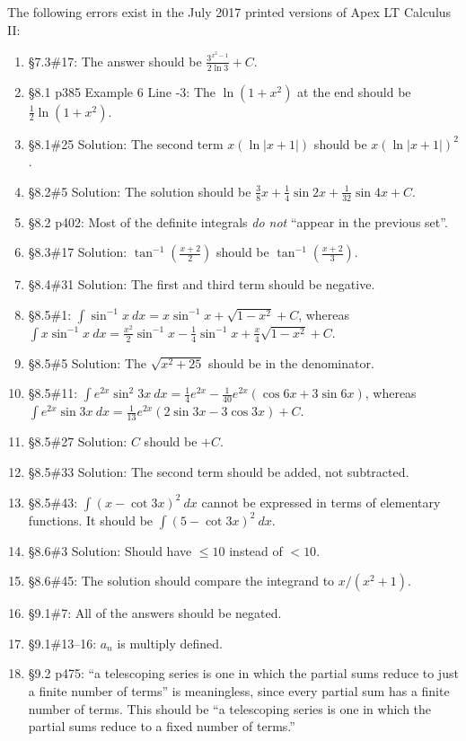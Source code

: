 \documentclass{amsart}
\newcommand{\ds}{\displaystyle}
\newcommand{\abs}[1]{\left\lvert#1\right\rvert}
\begin{document}
The following errors exist in the July 2017 printed versions of Apex LT Calculus II:
\begin{enumerate}
\item \S7.3\#17: The answer should be $\frac{3^{x^2-1}}{2\ln3}+C$.
\item \S8.1 p385 Example 6 Line -3: The $\ln(1+x^2)$ at the end should be $\frac12\ln(1+x^2)$.
\item \S8.1\#25 Solution: The second term $x\left(\ln\abs{x+1}\right)$ should be $x\left(\ln\abs{x+1}\right)^2$.
\item \S8.2\#5 Solution: The solution should be $\frac38 x+\frac14\sin2x+\frac1{32}\sin4x+C$.
\item \S8.2 p402: Most of the definite integrals \emph{do not} ``appear in the previous set''.
\item \S8.3\#17 Solution: $\tan^{-1}\left(\frac{x+2}2\right)$ should be $\tan^{-1}\left(\frac{x+2}3\right)$.
\item \S8.4\#31 Solution: The first and third term should be negative.
\item \S8.5\#1: $\int \sin^{-1}x\ dx=x\sin^{-1}x+\sqrt{1-x^2}+C$, whereas\\
$\int x\sin^{-1}x\ dx=\frac{x^2}{2} \sin^{-1}x - \frac{1}{4} \sin^{-1}x + \frac{x}{4} \sqrt{1-x^2}+C$.
\item \S8.5\#5 Solution: The $\sqrt{x^2+25}$ should be in the denominator.
\item \S8.5\#11: $\int e^{2x}\sin^2 3x\ dx=\frac14e^{2x}-\frac1{40}e^{2x}(\cos6x+3\sin6x)$, whereas $\int e^{2x}\sin 3x\ dx=\frac{1}{13} e^{2x}(2 \sin 3x - 3\cos 3x) +C$.
\item \S8.5\#27 Solution: $C$ should be $+C$.
\item \S8.5\#33 Solution: The second term should be added, not subtracted.
\item \S8.5\#43: $\ds\int(x-\cot 3x)^2\ dx$ cannot be expressed in terms of elementary functions.  It should be $\ds\int (5- \cot 3x)^2\ dx$.
\item \S8.6\#3 Solution: Should have $\le10$ instead of $<10$.
\item \S8.6\#45: The solution should compare the integrand to $x/(x^2+1)$.
\item \S9.1\#7: All of the answers should be negated.
\item \S9.1\#13--16: $a_n$ is multiply defined.
\item \S9.2 p475: ``a telescoping series is one in which the partial sums reduce to just a finite number of terms'' is meaningless, since every partial sum has a finite number of terms.  This should be ``a telescoping series is one in which the partial sums reduce to a fixed number of terms.''

\end{enumerate}
\end{document}
